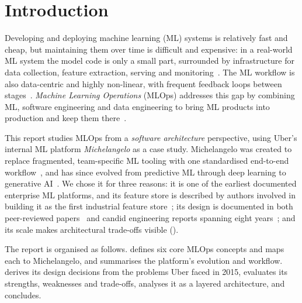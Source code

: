 ﻿%

\section{Introduction}
\label{sec:introduction}

Developing and deploying machine learning (ML) systems is relatively fast
and cheap, but maintaining them over time is difficult and expensive: in
a real-world ML system the model code is only a small part, surrounded by
infrastructure for data collection, feature extraction, serving and
monitoring~\cite{sculley2015hidden}. The ML workflow is also data-centric
and highly non-linear, with frequent feedback loops between
stages~\cite{amershi2019software}. \emph{Machine Learning Operations}
(MLOps) addresses this gap by combining ML, software engineering and
data engineering to bring ML products into production and keep them
there~\cite{kreuzberger2023mlops}.

This report studies MLOps from a \emph{software architecture} perspective,
using Uber's internal ML platform \emph{Michelangelo} as a case study.
Michelangelo was created to replace fragmented, team-specific ML tooling
with one standardised end-to-end workflow~\cite{delbalso2017meet}, and
has since evolved from predictive ML through deep learning to generative
AI~\cite{wang2024predictive}. We chose it for three reasons: it is one of
the earliest documented enterprise ML platforms, and its feature store is
described by authors involved in building it as the first industrial
feature store~\cite{orr2021managing}; its design is documented in both
peer-reviewed papers~\cite{li2017scaling,sun2020gallery} and candid
engineering reports spanning eight
years~\cite{delbalso2017meet,delbalso2018scaling,wang2024predictive}; and
its scale makes architectural trade-offs visible ().

The report is organised as follows.  defines six
core MLOps concepts and maps each to Michelangelo, and
 summarises the platform's evolution and
workflow.  derives its design decisions from
the problems Uber faced in 2015,  evaluates its
strengths, weaknesses and trade-offs, 
analyses it as a layered architecture, and 
concludes.